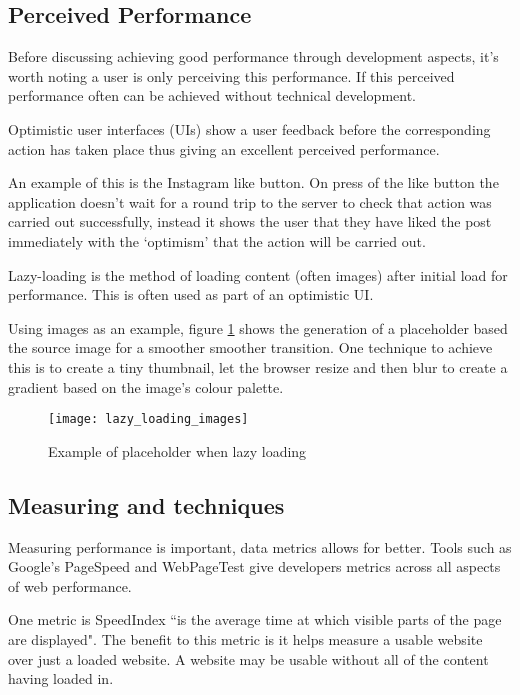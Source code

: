\subsection{Perceived Performance} \label{l-r--perceived-performance}

Before discussing achieving good performance through development aspects, it's worth noting a user is only perceiving this performance. If this perceived performance often can be achieved without technical development.

Optimistic user interfaces (UIs) show a user feedback before the corresponding action has taken place thus giving an excellent perceived performance.

An example of this is the Instagram like button. On press of the like button the application doesn't wait for a round trip to the server to check that action was carried out successfully, instead it shows the user that they have liked the post immediately with the `optimism' that the action will be carried out. \cite{performing_actions_optimisitically}

Lazy-loading is the method of loading content (often images) after initial load for performance. This is often used as part of an optimistic UI.

Using images as an example, figure \ref{figure-lazy-loading-images} shows the generation of a placeholder based the source image for a smoother smoother transition. One technique to achieve this is to create a tiny thumbnail, let the browser resize and then blur to create a gradient based on the image's colour palette. \cite{image_colours_lazy_loading}

\begin{figure}[H]
  \centering
    \texttt{[image: lazy\_loading\_images]}
  \caption{Example of placeholder when lazy loading \protect\cite{image_colours_lazy_loading}}
  \label{figure-lazy-loading-images}
\end{figure}

\subsection{Measuring and techniques} \label{l-r--measuring-and-techniques}

Measuring performance is important, data metrics allows for better. Tools such as Google's PageSpeed and WebPageTest give developers metrics across all aspects of web performance. %

One metric is SpeedIndex ``is the average time at which visible parts of the page are displayed". The benefit to this metric is it helps measure a usable website over just a loaded website. A website may be usable without all of the content having loaded in. \cite{speed_index}

